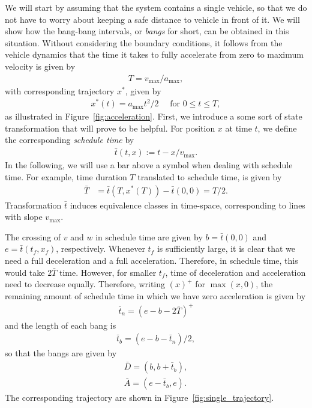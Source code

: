 \documentclass[a4paper]{article}
\theoremstyle{definition}
\theoremstyle{plain}
\begin{document}
We will start by assuming that the system contains a single vehicle, so that we
do not have to worry about keeping a safe distance to vehicle in front of it. We
will show how the bang-bang intervals, or \textit{bangs} for short, can be
obtained in this situation.
%
Without considering the boundary conditions, it follows from the vehicle
dynamics that the time it takes to fully accelerate from zero to maximum
velocity is given by
\begin{align*}
  T = v_{\max} / a_{\max} ,
\end{align*}
with corresponding trajectory $x^{*}$, given by
\begin{align*}
  x^{*}(t) = a_{\max} t^{2} / 2 \quad \text{ for }0 \leq t \leq T ,
\end{align*}
as illustrated in Figure~\ref{fig:acceleration}.
%
First, we introduce a some sort of state transformation that will prove to be
helpful. For position $x$ at time $t$, we define the corresponding \textit{schedule time}
by
\begin{align*}
  \bar{t}(t, x) := t - x / v_{\max} .
\end{align*}
In the following, we will use a bar above a symbol when dealing with schedule
time.
%
For example, time duration $T$ translated to schedule time, is given by
\begin{align*}
  \bar{T} &= \bar{t}(T, x^{*}(T)) - \bar{t}(0, 0) = T / 2 .
\end{align*}
{\color{blue} Transformation $\bar{t}$ induces equivalence classes in time-space, corresponding to lines with slope $v_{\max}$.}

The crossing of $v$ and $w$ in schedule time are given by $b = \bar{t}(0, 0)$
and $e = \bar{t}(t_{f}, x_{f})$, respectively.
%
Whenever $t_{f}$ is sufficiently large, it is clear that we need a full
deceleration and a full acceleration. Therefore, in schedule time, this would
take $2 \bar{T}$ time.
%
However, for smaller $t_{f}$, time of deceleration and acceleration need to
decrease equally. Therefore, writing $(x)^{+}$ for $\max(x, 0)$, the remaining
amount of schedule time in which we have zero acceleration is given by
\begin{align*}
  \bar{t}_{n} = {(e - b - 2\bar{T})}^{+}
\end{align*}
and the length of each bang is
\begin{align*}
  \bar{t}_{b} = (e - b - \bar{t}_{n}) / 2 ,
\end{align*}
so that the bangs are given by
\begin{align*}
  \bar{D} = (b, b + \bar{t}_{b}) , \\
  \bar{A} = (e - \bar{t}_{b}, e) .
\end{align*}
The corresponding trajectory are shown in Figure~\ref{fig:single_trajectory}.
\end{document}
